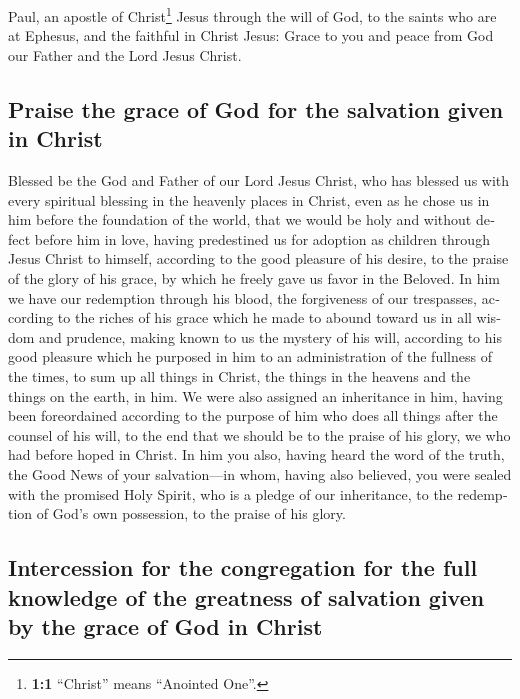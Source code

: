 \begin{paracol}{2}
\begin{otherlanguage}{english}
 Paul, an apostle of Christ\footnote{\textbf{1:1}
  ``Christ'' means ``Anointed One''.} Jesus through the will of God, to
the saints who are at Ephesus, and the faithful in Christ Jesus:
 Grace to you and peace from God our Father and the Lord
Jesus Christ.

\hypertarget{praise-the-grace-of-god-for-the-salvation-given-in-christ}{%
\subsection{Praise the grace of God for the salvation given in
Christ}\label{praise-the-grace-of-god-for-the-salvation-given-in-christ}}

 Blessed be the God and Father of our Lord Jesus Christ,
who has blessed us with every spiritual blessing in the heavenly places
in Christ,  even as he chose us in him before the
foundation of the world, that we would be holy and without defect before
him in love,  having predestined us for adoption as
children through Jesus Christ to himself, according to the good pleasure
of his desire,  to the praise of the glory of his grace,
by which he freely gave us favor in the Beloved.  In him
we have our redemption through his blood, the forgiveness of our
trespasses, according to the riches of his grace  which he
made to abound toward us in all wisdom and prudence, 
making known to us the mystery of his will, according to his good
pleasure which he purposed in him  to an administration
of the fullness of the times, to sum up all things in Christ, the things
in the heavens and the things on the earth, in him.  We
were also assigned an inheritance in him, having been foreordained
according to the purpose of him who does all things after the counsel of
his will,  to the end that we should be to the praise of
his glory, we who had before hoped in Christ.  In him you
also, having heard the word of the truth, the Good News of your
salvation---in whom, having also believed, you were sealed with the
promised Holy Spirit,  who is a pledge of our
inheritance, to the redemption of God's own possession, to the praise of
his glory.

\hypertarget{intercession-for-the-congregation-for-the-full-knowledge-of-the-greatness-of-salvation-given-by-the-grace-of-god-in-christ}{%
\subsection{Intercession for the congregation for the full knowledge of
the greatness of salvation given by the grace of God in
Christ}\label{intercession-for-the-congregation-for-the-full-knowledge-of-the-greatness-of-salvation-given-by-the-grace-of-god-in-christ}}


\end{otherlanguage}
\end{paracol}
